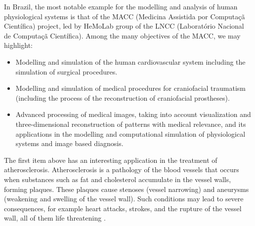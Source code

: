 In Brazil, the most notable example for the modelling and analysis of human physiological systems is that of the MACC (Medicina Assistida por Computa\c{c}\~a Cient\'ifica) project, led by HeMoLab group of the LNCC (Laborat\'orio Nacional de Computa\c{c}\~a Cient\'ifica). Among the many objectives of the MACC, we may highlight: 

\begin{itemize}
\item Modelling and simulation of the human cardiovascular system including the simulation of surgical procedures.
\item Modelling and simulation of medical procedures for craniofacial traumatism (including the process of the reconstruction of craniofacial prostheses).
\item Advanced processing of medical images, taking into account visualization and three-dimensional reconstruction of patterns with medical relevance, and its applications in the modelling and computational simulation of physiological systems and image based diagnosis.
\end{itemize}

The first item above has an interesting application in the treatment of atherosclerosis. Atherosclerosis is a pathology of the blood vessels that occurs when substances such as fat and cholesterol accumulate in the vessel walls, forming plaques. These plaques cause stenoses (vessel narrowing) and aneurysms (weakening and swelling of the vessel wall). Such conditions may lead to severe consequences, for example heart attacks, strokes, and the rupture of the vessel wall, all of them life threatening \citep{Gennest,Libby}.

